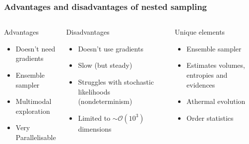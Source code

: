 \documentclass[aspectratio=169]{beamer}
\begin{document}
\begin{frame}
    \frametitle{Advantages and disadvantages of nested sampling}
    \begin{columns}[t]
        \begin{exampleblock}{Advantages}
            \begin{itemize}
                \item Doesn't need gradients
                \item Ensemble sampler
                \item Multimodal exploration
                \item Very Parallelisable
            \end{itemize}
        \end{exampleblock}
        \begin{alertblock}{Disadvantages}
            \begin{itemize}
                \item Doesn't use gradients
                \item Slow (but steady)
                \item Struggles with stochastic likelihoods (nondeterminism)
                \item Limited to $\sim\mathcal{O}(10^3)$ dimensions
            \end{itemize}
        \end{alertblock}
        \begin{block}{Unique elements}
            \begin{itemize}
                \item Ensemble sampler
                \item Estimates volumes, entropies and evidences
                \item Athermal evolution
                \item Order statistics
            \end{itemize}
        \end{block}
    \end{columns}
\end{frame}
\end{document}
